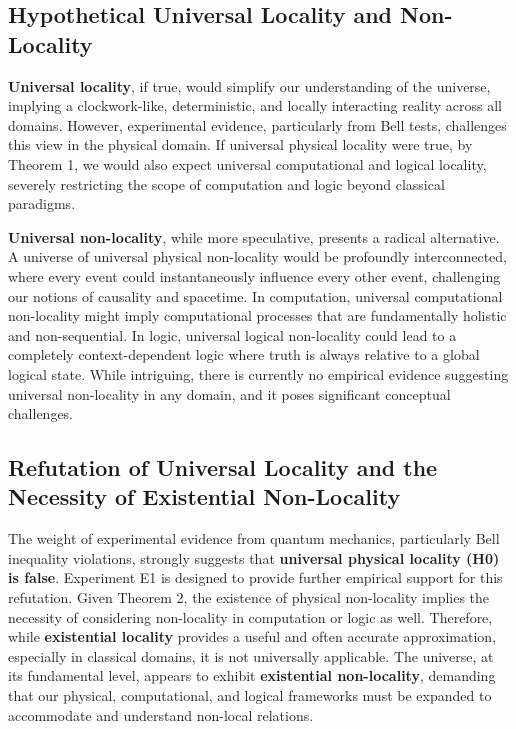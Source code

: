 	\subsection{Hypothetical Universal Locality and Non-Locality}
	
	\textbf{Universal locality}, if true, would simplify our understanding of the universe, implying a clockwork-like, deterministic, and locally interacting reality across all domains. However, experimental evidence, particularly from Bell tests, challenges this view in the physical domain.  If universal physical locality were true, by Theorem 1, we would also expect universal computational and logical locality, severely restricting the scope of computation and logic beyond classical paradigms.
	
	\textbf{Universal non-locality}, while more speculative, presents a radical alternative.  A universe of universal physical non-locality would be profoundly interconnected, where every event could instantaneously influence every other event, challenging our notions of causality and spacetime.  In computation, universal computational non-locality might imply computational processes that are fundamentally holistic and non-sequential.  In logic, universal logical non-locality could lead to a completely context-dependent logic where truth is always relative to a global logical state. While intriguing, there is currently no empirical evidence suggesting universal non-locality in any domain, and it poses significant conceptual challenges.
	
	\subsection{Refutation of Universal Locality and the Necessity of Existential Non-Locality}
	
	The weight of experimental evidence from quantum mechanics, particularly Bell inequality violations, strongly suggests that \textbf{universal physical locality (H0) is false}. Experiment E1 is designed to provide further empirical support for this refutation.  Given Theorem 2, the existence of physical non-locality implies the necessity of considering non-locality in computation or logic as well.  Therefore, while \textbf{existential locality} provides a useful and often accurate approximation, especially in classical domains, it is not universally applicable.  The universe, at its fundamental level, appears to exhibit \textbf{existential non-locality}, demanding that our physical, computational, and logical frameworks must be expanded to accommodate and understand non-local relations.
	
